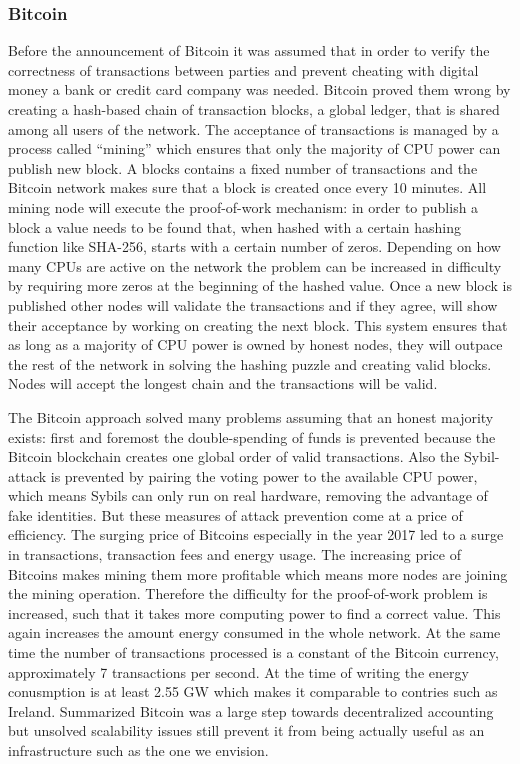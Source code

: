 \subsubsection{Bitcoin}
Before the announcement of Bitcoin it was assumed that in order to verify the correctness of 
transactions between parties and prevent cheating with digital money a bank or credit card company
was needed. Bitcoin proved them wrong by creating a hash-based chain of transaction blocks, a global 
ledger, that is shared among all users of the network. The acceptance of transactions is managed by 
a process called ``mining'' which ensures that only the majority of CPU power can publish new 
block. A blocks contains a fixed number of transactions and the Bitcoin network makes sure that a
block is created once every 10 minutes. All mining node will execute the proof-of-work mechanism: 
in order to publish a block a value needs to be found that, when hashed with a certain hashing 
function like SHA-256, starts with a certain number of zeros. Depending on how many CPUs are active
on the network the problem can be increased in difficulty by requiring more zeros at the beginning 
of the hashed value. Once a new block is published other nodes will validate the transactions and 
if they agree, will show their acceptance by working on creating the next block. This system ensures
that as long as a majority of CPU power is owned by honest nodes, they will outpace the rest of the
network in solving the hashing puzzle and creating valid blocks. Nodes will accept the longest chain
and the transactions will be valid.

The Bitcoin approach solved many problems assuming that an honest majority exists: first and 
foremost the double-spending of funds is prevented because the Bitcoin blockchain creates one global
order of valid transactions. Also the Sybil-attack is prevented by pairing the voting power to the
available CPU power, which means Sybils can only run on real hardware, removing the advantage of
fake identities. But these measures of attack prevention come at a price of efficiency. The surging 
price of Bitcoins especially in the year 2017 led to a surge in transactions, transaction fees and
energy usage. The increasing price of Bitcoins makes mining them more profitable which means more 
nodes are joining the mining operation. Therefore the difficulty for the proof-of-work problem is 
increased, such that it takes more computing power to find a correct value. This again increases the
amount energy consumed in the whole network. At the same time the number of transactions processed
is a constant of the Bitcoin currency, approximately 7 transactions per second. At the time of 
writing the energy conusmption is at least 2.55 GW which makes it comparable to contries such as 
Ireland. Summarized Bitcoin was a large step towards decentralized accounting but unsolved 
scalability issues still prevent it from being actually useful as an infrastructure such as the one 
we envision.

